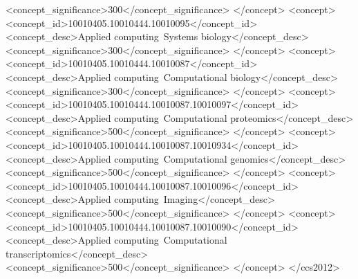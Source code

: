 \documentclass[sigconf,revew,screen,timestamp,nonacm]{acmart}
\begin{document}
\begin{CCSXML}
       <concept_significance>300</concept_significance>
       </concept>
   <concept>
       <concept_id>10010405.10010444.10010095</concept_id>
       <concept_desc>Applied computing~Systems biology</concept_desc>
       <concept_significance>300</concept_significance>
       </concept>
   <concept>
       <concept_id>10010405.10010444.10010087</concept_id>
       <concept_desc>Applied computing~Computational biology</concept_desc>
       <concept_significance>300</concept_significance>
       </concept>
   <concept>
       <concept_id>10010405.10010444.10010087.10010097</concept_id>
       <concept_desc>Applied computing~Computational proteomics</concept_desc>
       <concept_significance>500</concept_significance>
       </concept>
   <concept>
       <concept_id>10010405.10010444.10010087.10010934</concept_id>
       <concept_desc>Applied computing~Computational genomics</concept_desc>
       <concept_significance>500</concept_significance>
       </concept>
   <concept>
       <concept_id>10010405.10010444.10010087.10010096</concept_id>
       <concept_desc>Applied computing~Imaging</concept_desc>
       <concept_significance>500</concept_significance>
       </concept>
   <concept>
       <concept_id>10010405.10010444.10010087.10010090</concept_id>
       <concept_desc>Applied computing~Computational transcriptomics</concept_desc>
       <concept_significance>500</concept_significance>
       </concept>
 </ccs2012>
\end{CCSXML}


\end{document}
